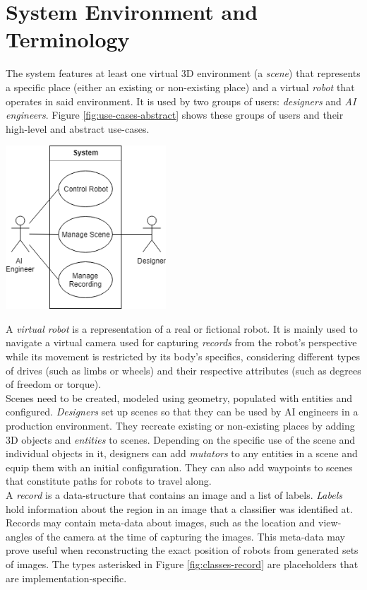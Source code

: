\section{System Environment and Terminology}
The system features at least one virtual 3D environment (a \textit{scene}) that represents a specific place (either an existing or non-existing place) and a virtual \textit{robot} that operates in said environment. It is used by two groups of users: \textit{designers} and \textit{\ac{AI} engineers}. Figure \ref{fig:use-cases-abstract} shows these groups of users and their high-level and abstract use-cases.
\begin{center}
\noindent\includegraphics[width=6cm]{tex/img/ch04/UseCases_HighLevel_01.png}
\label{fig:use-cases-abstract}
\end{center}
A \textit{virtual robot} is a representation of a real or fictional robot. It is mainly used to navigate a virtual camera used for capturing \textit{records} from the robot's perspective while its movement is restricted by its body's specifics, considering different types of drives (such as limbs or wheels) and their respective attributes (such as degrees of freedom or torque).\\
Scenes need to be created, modeled using geometry, populated with entities and configured. \textit{Designers} set up scenes so that they can be used by \acs{AI} engineers in a production environment. They recreate existing or non-existing places by adding 3D objects and \textit{entities} to scenes. Depending on the specific use of the scene and individual objects in it, designers can add \textit{mutators} to any entities in a scene and equip them with an initial configuration. They can also add waypoints to scenes that constitute paths for robots to travel along.\\
A \textit{record} is a data-structure that contains an image and a list of labels. \textit{Labels} hold information about the region in an image that a classifier was identified at. Records may contain meta-data about images, such as the location and view-angles of the camera at the time of capturing the images. This meta-data may prove useful when reconstructing the exact position of robots from generated sets of images. The types asterisked in Figure \ref{fig:classes-record} are placeholders that are implementation-specific.
